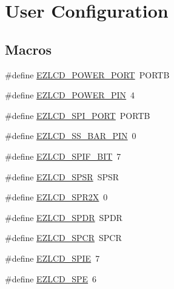 \hypertarget{group__ez_l_c_d__103__user__config}{\section{User Configuration}
\label{group__ez_l_c_d__103__user__config}
}
\subsection*{Macros}
\begin{DoxyCompactItemize}
\item 
\#define \hyperlink{group__ez_l_c_d__103__user__config_gabc2bd342f0f29fa5ea7ddff9ae41d75e}{E\-Z\-L\-C\-D\-\_\-\-P\-O\-W\-E\-R\-\_\-\-P\-O\-R\-T}~P\-O\-R\-T\-B
\item 
\#define \hyperlink{group__ez_l_c_d__103__user__config_gad5c043aceb56f2cf3b1750e4b8e1398c}{E\-Z\-L\-C\-D\-\_\-\-P\-O\-W\-E\-R\-\_\-\-P\-I\-N}~4
\item 
\#define \hyperlink{group__ez_l_c_d__103__user__config_ga4be156c889cb0fd12e44107a54d212ec}{E\-Z\-L\-C\-D\-\_\-\-S\-P\-I\-\_\-\-P\-O\-R\-T}~P\-O\-R\-T\-B
\item 
\#define \hyperlink{group__ez_l_c_d__103__user__config_gaa5185668bf24c5de3067f78960330117}{E\-Z\-L\-C\-D\-\_\-\-S\-S\-\_\-\-B\-A\-R\-\_\-\-P\-I\-N}~0
\item 
\#define \hyperlink{group__ez_l_c_d__103__user__config_gac83071f022e9bf6aedf226095c9a2f47}{E\-Z\-L\-C\-D\-\_\-\-S\-P\-I\-F\-\_\-\-B\-I\-T}~7
\item 
\#define \hyperlink{group__ez_l_c_d__103__user__config_ga0a3069206c81d1a0b74d83e52b9ddfd8}{E\-Z\-L\-C\-D\-\_\-\-S\-P\-S\-R}~S\-P\-S\-R
\item 
\#define \hyperlink{group__ez_l_c_d__103__user__config_gaf31393f19135510f78c7e0a3c71b682d}{E\-Z\-L\-C\-D\-\_\-\-S\-P\-R2\-X}~0
\item 
\#define \hyperlink{group__ez_l_c_d__103__user__config_ga42e8ca7530ac3d9e7c9bfe63df2559ab}{E\-Z\-L\-C\-D\-\_\-\-S\-P\-D\-R}~S\-P\-D\-R
\item 
\#define \hyperlink{group__ez_l_c_d__103__user__config_ga0205242a776d9aab15150edb665e3941}{E\-Z\-L\-C\-D\-\_\-\-S\-P\-C\-R}~S\-P\-C\-R
\item 
\#define \hyperlink{group__ez_l_c_d__103__user__config_gad257a8388d58c8c334fd6e6560d62af6}{E\-Z\-L\-C\-D\-\_\-\-S\-P\-I\-E}~7
\item 
\#define \hyperlink{group__ez_l_c_d__103__user__config_gac51ec184538e38e946fdc90813cc58af}{E\-Z\-L\-C\-D\-\_\-\-S\-P\-E}~6

\end{DoxyCompactItemize}
